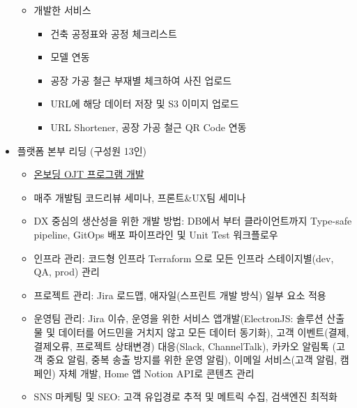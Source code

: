 \begin{itemize}
\begin{itemize}[label=$\star$]
		      \item 개발한 서비스
		            \begin{itemize}
			            \item 건축 공정표와 공정 체크리스트
			            \item 모델 연동
			            \item 공장 가공 철근 부재별 체크하여 사진 업로드
			            \item URL에 해당 데이터 저장 및 S3 이미지 업로드
			            \item URL Shortener, 공장 가공 철근 QR Code 연동
		            \end{itemize}
	      \end{itemize}
	\item 플랫폼 본부 리딩 (구성원 13인)
	      \begin{itemize}[label=$\star$]
		      \item \href{https://organization-pjk.gitbook.io/developer-ojt-program/}{온보딩 OJT 프로그램 개발}
		      \item 매주 개발팀 코드리뷰 세미나, 프론트\&UX팀 세미나
		      \item DX 중심의 생산성을 위한 개발 방법: DB에서 부터 클라이언트까지 Type-safe pipeline, GitOps 배포 파이프라인 및 Unit Test 워크플로우
		      \item 인프라 관리: 코드형 인프라 Terraform 으로 모든 인프라 스테이지별(dev, QA, prod) 관리
		      \item 프로젝트 관리: Jira 로드맵, 애자일(스프린트 개발 방식) 일부 요소 적용
		      \item 운영팀 관리: Jira 이슈, 운영을 위한 서비스 앱개발(ElectronJS: 솔루션 산출물 및 데이터를 어드민을 거치지 않고 모든 데이터 동기화), 고객 이벤트(결제, 결제오류, 프로젝트 상태변경) 대응(Slack, ChannelTalk), 카카오 알림톡 (고객 중요 알림, 중복 송출 방지를 위한 운영 알림), 이메일 서비스(고객 알림, 캠페인) 자체 개발, Home  앱 Notion API로 콘텐츠 관리
		      \item SNS 마케팅 및 SEO: 고객 유입경로 추적 및 메트릭 수집, 검색엔진 최적화
	      \end{itemize}
\end{itemize}

\divider

